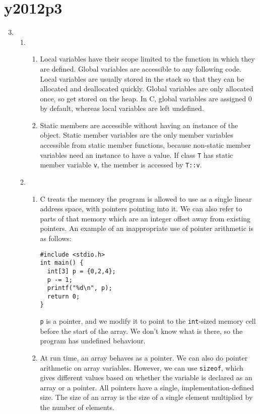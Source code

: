 \documentclass{article}
\begin{document}
\section*{y2012p3}
\begin{enumerate}
\setcounter{enumi}{2}
  \item
    \begin{enumerate}
      \item
        \begin{enumerate}
          \item Local variables have their scope limited to the function in which they are defined. Global variables are accessible to any following code. Local variables are usually stored in the stack so that they can be allocated and deallocated quickly. Global variables are only allocated once, so get stored on the heap. In C, global variables are assigned 0 by default, whereas local variables are left undefined.
          \item Static members are accessible without having an instance of the object. Static member variables are the only member variables accessible from static member functions, because non-static member variables need an instance to have a value. If class \texttt{T} has static member variable \texttt{v}, the member is accessed by \texttt{T::v}.
        \end{enumerate}
      \item
        \begin{enumerate}
          \item C treats the memory the program is allowed to use as a single linear address space, with pointers pointing into it. We can also refer to parts of that memory which are an integer offset away from existing pointers. An example of an inappropriate use of pointer arithmetic is as follows:
            \begin{lstlisting}
#include <stdio.h>
int main() {
  int[3] p = {0,2,4};
  p -= 1;
  printf("%d\n", p);
  return 0;
}
            \end{lstlisting}
            \texttt{p} is a pointer, and we modify it to point to the \texttt{int}-sized memory cell before the start of the array. We don't know what is there, so the program has undefined behaviour.
          \item At run time, an array behaves as a pointer. We can also do pointer arithmetic on array variables. However, we can use \texttt{sizeof}, which gives different values based on whether the variable is declared as an array or a pointer. All pointers have a single, implementation-defined size. The size of an array is the size of a single element multiplied by the number of elements.

\end{enumerate}
\end{enumerate}
\end{enumerate}
\end{document}
